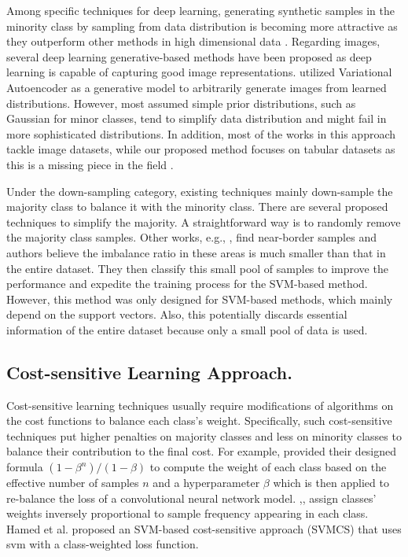 Among specific techniques for deep learning, generating synthetic samples in the minority class by sampling from data distribution is becoming more attractive as they outperform other methods in high dimensional data \cite{DBLP:conf/dmin/LiuGM07}. Regarding images, several deep learning generative-based methods have been proposed as deep learning is capable of capturing good image representations. \cite{rashid_convergence_2012} \cite{dai_generative_2019} \cite{mullick_generative_2019} utilized Variational Autoencoder as a generative model to arbitrarily generate images from learned distributions. However, most assumed simple prior distributions, such as Gaussian for minor classes, tend to simplify data distribution and might fail in more sophisticated distributions. In addition, most of the works in this approach tackle image datasets, while our proposed method focuses on tabular datasets as this is a missing piece in the field \cite{johnson_survey_2019}.

Under the down-sampling category, existing techniques mainly down-sample the majority class to balance it with the minority class. There are several proposed techniques to simplify the majority. A straightforward way is to randomly remove the majority class samples. Other works, e.g., \cite{ertekin_learning_2007}, \cite{aggarwal_active_2020} find near-border samples and authors believe the imbalance ratio in these areas is much smaller than that in the entire dataset. They then classify this small pool of samples to improve the performance and expedite the training process for the SVM-based method. However, this method was only designed for SVM-based methods, which mainly depend on the support vectors. Also, this potentially discards essential information of the entire dataset because only a small pool of data is used.  

  
\subsection{Cost-sensitive Learning Approach.}
Cost-sensitive learning techniques usually require modifications of algorithms on the cost functions to balance each class's weight. Specifically, such cost-sensitive techniques put higher penalties on majority classes and less on minority classes to balance their contribution to the final cost. For example,  \cite{cui_class-balanced_2019} provided their designed formula $ (1 - \beta^n)/(1 - \beta)$ to compute the weight of each class based on the effective number of samples $n$ and a hyperparameter $\beta$ which is then applied to re-balance the loss of a convolutional neural network model.  \cite{huang_learning_2016},\cite{rangarajan_sridhar_unsupervised_2015}, \cite{DBLP:journals/corr/abs-1805-00932} assign classes' weights inversely proportional to sample frequency appearing in each class. Hamed et al. \cite{cssvm} proposed an SVM-based cost-sensitive approach (SVMCS) that uses svm with a class-weighted loss function.  
  
